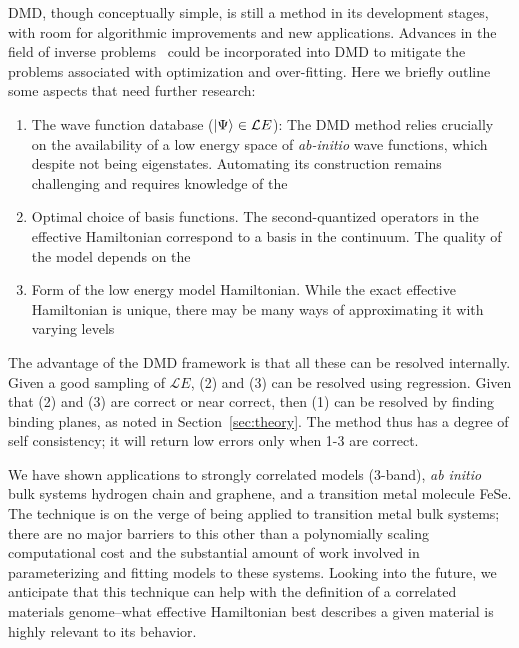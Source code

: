 DMD, though conceptually simple, is still a method in its development stages, with room for algorithmic improvements and new applications. 
Advances in the field of inverse problems~\cite{Berg2017} could be incorporated into DMD to 
mitigate the problems associated with optimization and over-fitting. 
Here we briefly outline some aspects that need further research:
\begin{enumerate}
	\item The wave function database ($\ket{\Psi} \in {\mathcal LE}$):
	The DMD method relies crucially on the availability of a low energy space of \textit{ab-initio} wave functions, which despite not being eigenstates. Automating its construction remains challenging and requires knowledge of the 
	\item Optimal choice of basis functions. The second-quantized operators in the effective Hamiltonian correspond to a basis in the continuum. The quality of the model depends on the
	\item Form of the low energy model Hamiltonian. While the exact effective Hamiltonian is unique, there may be many ways of approximating it with varying levels
\end{enumerate} 
The advantage of the DMD framework is that all these can be resolved internally.
Given a good sampling of ${\mathcal LE}$, (2) and (3) can be resolved using regression. 
Given that (2) and (3) are correct or near correct, then (1) can be resolved by finding binding planes, as noted in Section~\ref{sec:theory}.
The method thus has a degree of self consistency; it will return low errors only when 1-3 are correct.

We have shown applications to strongly correlated models (3-band), {\it ab initio} bulk systems hydrogen chain and graphene, and a transition metal molecule FeSe.
The technique is on the verge of being applied to transition metal bulk systems; there are no major barriers to this other than a polynomially scaling computational cost and the substantial amount of work involved in parameterizing and fitting models to these systems.
Looking into the future, we anticipate that this technique can help with the definition of a correlated materials genome--what effective Hamiltonian best describes a given material is highly relevant to its behavior.


